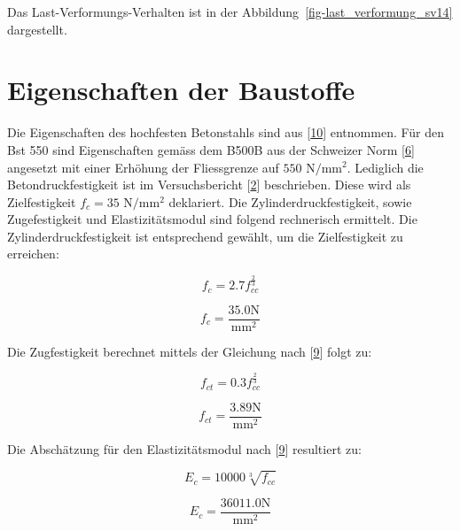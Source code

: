 \documentclass[
  12pt,
  letterpaper,
  egregdoesnotlikesansseriftitles]{scrreprt}
\begin{document}
Das Last-Verformungs-Verhalten ist in der
Abbildung~\ref{fig-last_verformung_sv14} dargestellt.

\hypertarget{eigenschaften-der-baustoffe-1}{%
\section{Eigenschaften der
Baustoffe}\label{eigenschaften-der-baustoffe-1}}

Die Eigenschaften des hochfesten Betonstahls sind aus
{[}\protect\hyperlink{ref-annahutte_broschure}{10}{]} entnommen. Für den
Bst 550 sind Eigenschaften gemäss dem B500B aus der Schweizer Norm
{[}\protect\hyperlink{ref-SIA2013a}{6}{]} angesetzt mit einer Erhöhung
der Fliessgrenze auf \(550 \text{ N}/\text{mm}^2\). Lediglich die
Betondruckfestigkeit ist im Versuchsbericht
{[}\protect\hyperlink{ref-Tue2019}{2}{]} beschrieben. Diese wird als
Zielfestigkeit \(f_c = 35 \text{ N}/\text{mm}^2\) deklariert. Die
Zylinderdruckfestigkeit, sowie Zugefestigkeit und Elastizitätsmodul sind
folgend rechnerisch ermittelt. Die Zylinderdruckfestigkeit ist
entsprechend gewählt, um die Zielfestigkeit zu erreichen:

\begin{equation}f_{c} = 2.7 f_{cc}^{\frac{2}{3}}\end{equation}

\begin{equation}f_{c} = \frac{35.0 \text{N}}{\text{mm}^{2}}\end{equation}

Die Zugfestigkeit berechnet mittels der Gleichung nach
{[}\protect\hyperlink{ref-Jaeger2013}{9}{]} folgt zu:

\begin{equation}f_{ct} = 0.3 f_{cc}^{\frac{2}{3}}\end{equation}

\begin{equation}f_{ct} = \frac{3.89 \text{N}}{\text{mm}^{2}}\end{equation}

Die Abschätzung für den Elastizitätsmodul nach
{[}\protect\hyperlink{ref-Jaeger2013}{9}{]} resultiert zu:

\begin{equation}E_{c} = 10000 \sqrt[3]{f_{cc}}\end{equation}

\begin{equation}E_{c} = \frac{36011.0 \text{N}}{\text{mm}^{2}}\end{equation}
\end{document}
